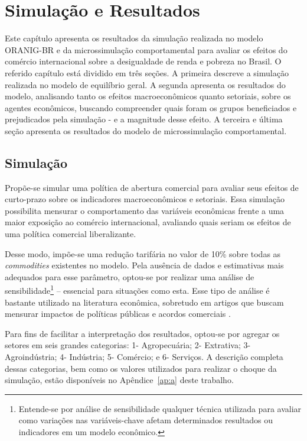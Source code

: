 

\chapter{Simulação e Resultados} \label{cha:resultados}

Este capítulo apresenta os resultados da simulação realizada no modelo ORANIG-BR e da microssimulação comportamental para avaliar os efeitos do comércio internacional sobre a desigualdade de renda e pobreza no Brasil. O referido capítulo está dividido em três seções. A primeira descreve a simulação realizada no modelo de equilíbrio geral. A segunda apresenta os resultados do modelo, analisando tanto os efeitos macroeconômicos quanto setoriais, sobre os agentes econômicos, buscando compreender quais foram os grupos beneficiados e prejudicados pela simulação - e a magnitude desse efeito. A terceira e última seção apresenta os resultados do modelo de microssimulação comportamental.



\section{Simulação} \label{sec:simulacao}

Propõe-se simular uma política de abertura comercial para avaliar seus efeitos de curto-prazo sobre os indicadores macroeconômicos e setoriais. Essa simulação possibilita mensurar o comportamento das variáveis econômicas frente a uma maior exposição ao comércio internacional, avaliando quais seriam os efeitos de uma política comercial liberalizante.

Desse modo, impõe-se uma redução tarifária no valor de 10\% sobre todas as \textit{commodities} existentes no modelo. Pela ausência de dados e estimativas mais adequados para esse parâmetro, optou-se por realizar uma análise de sensibilidade\footnote{Entende-se por análise de sensibilidade qualquer técnica utilizada para avaliar como variações nas variáveis-chave afetam determinados resultados ou indicadores em um modelo econômico.} -- essencial para situações como esta. Esse tipo de análise é bastante utilizado na literatura econômica, sobretudo em artigos que buscam mensurar impactos de políticas públicas e acordos comerciais \cite{haddad05, domingues08,perobelli17}.

Para fins de facilitar a interpretação dos resultados, optou-se por agregar os setores em seis grandes categorias: 1- Agropecuária; 2- Extrativa; 3- Agroindústria; 4- Indústria; 5- Comércio; e 6- Serviços. A descrição completa dessas categorias, bem como os valores utilizados para realizar o choque da simulação, estão disponíveis no Apêndice~\ref{ap:a} deste trabalho.



